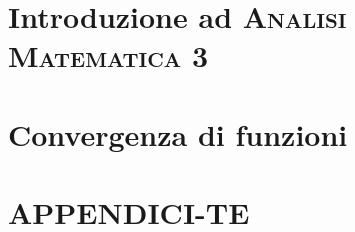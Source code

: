 \documentclass[a4paper, 11pt, twoside, openright, italian]{memoir}
\begin{document}
\frontmatter




\mainmatter

\part{Introduzione ad \textsc{Analisi Matematica 3}}

\part{Convergenza di funzioni}



%
%
%
%
%
%
%
%
\part{APPENDICI-TE}

%

%
\backmatter

\end{document}
